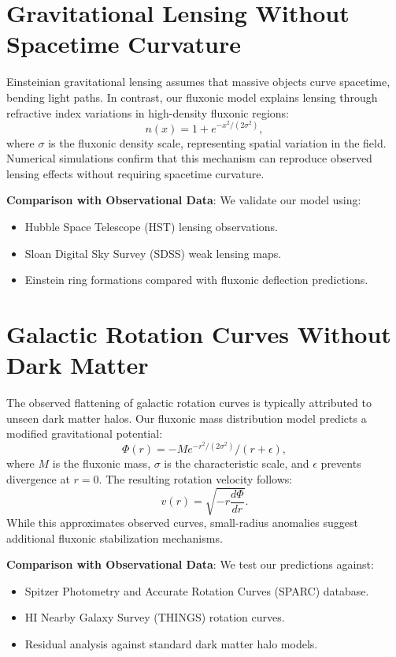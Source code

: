 \documentclass{article}
\begin{document}
\section{Gravitational Lensing Without Spacetime Curvature}
Einsteinian gravitational lensing assumes that massive objects curve spacetime, bending light paths. In contrast, our fluxonic model explains lensing through refractive index variations in high-density fluxonic regions:
\begin{equation}
    n(x) = 1 + e^{-x^2 / (2\sigma^2)},
\end{equation}
where \(\sigma\) is the fluxonic density scale, representing spatial variation in the field. Numerical simulations confirm that this mechanism can reproduce observed lensing effects without requiring spacetime curvature.

\textbf{Comparison with Observational Data}: We validate our model using:
\begin{itemize}
    \item Hubble Space Telescope (HST) lensing observations.
    \item Sloan Digital Sky Survey (SDSS) weak lensing maps.
    \item Einstein ring formations compared with fluxonic deflection predictions.
\end{itemize}

\section{Galactic Rotation Curves Without Dark Matter}
The observed flattening of galactic rotation curves is typically attributed to unseen dark matter halos. Our fluxonic mass distribution model predicts a modified gravitational potential:
\begin{equation}
    \Phi(r) = -M e^{-r^2 / (2 \sigma^2)} / (r + \epsilon),
\end{equation}
where \(M\) is the fluxonic mass, \(\sigma\) is the characteristic scale, and \(\epsilon\) prevents divergence at \(r = 0\). The resulting rotation velocity follows:
\begin{equation}
    v(r) = \sqrt{-r \frac{d\Phi}{dr}}.
\end{equation}
While this approximates observed curves, small-radius anomalies suggest additional fluxonic stabilization mechanisms.

\textbf{Comparison with Observational Data}: We test our predictions against:
\begin{itemize}
    \item Spitzer Photometry and Accurate Rotation Curves (SPARC) database.
    \item HI Nearby Galaxy Survey (THINGS) rotation curves.
    \item Residual analysis against standard dark matter halo models.
\end{itemize}
\end{document}
